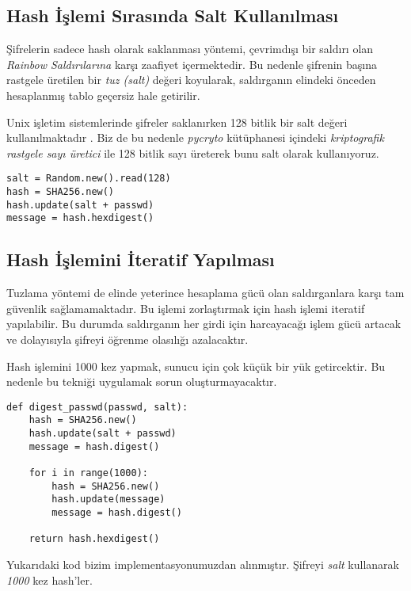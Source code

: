 \documentclass[11pt,a4paper]{report}
\begin{document}
\subsection{Hash İşlemi Sırasında Salt Kullanılması}

Şifrelerin sadece hash olarak saklanması yöntemi, çevrimdışı bir saldırı olan \emph{Rainbow Saldırılarına} karşı zaafiyet içermektedir. Bu nedenle şifrenin başına rastgele üretilen bir \emph{tuz (salt)} değeri koyularak, saldırganın elindeki önceden hesaplanmış tablo geçersiz hale getirilir.

Unix işletim sistemlerinde şifreler saklanırken 128 bitlik bir salt değeri kullanılmaktadır \cite{unixsalt}. Biz de bu nedenle \emph{pycryto} kütüphanesi içindeki \emph{kriptografik rastgele sayı üretici} ile 128 bitlik sayı üreterek bunu salt olarak kullanıyoruz.

\begin{lstlisting}[caption=Python salt ile SHA256 Kullanımı]
salt = Random.new().read(128)
hash = SHA256.new()
hash.update(salt + passwd)
message = hash.hexdigest()
\end{lstlisting}


\subsection{Hash İşlemini İteratif Yapılması}

Tuzlama yöntemi de elinde yeterince hesaplama gücü olan saldırganlara karşı tam güvenlik sağlamamaktadır. Bu işlemi zorlaştırmak için hash işlemi iteratif yapılabilir. Bu durumda saldırganın her girdi için harcayacağı işlem gücü artacak ve dolayısıyla şifreyi öğrenme olasılığı azalacaktır.

Hash işlemini 1000 kez yapmak, sunucu için çok küçük bir yük getircektir. Bu nedenle bu tekniği uygulamak sorun oluşturmayacaktır.

\begin{lstlisting}[caption=Python iteratif SHA256 Kullanımı]
def digest_passwd(passwd, salt):
    hash = SHA256.new()
    hash.update(salt + passwd)
    message = hash.digest()

    for i in range(1000):
        hash = SHA256.new()
        hash.update(message)
        message = hash.digest()

    return hash.hexdigest()
\end{lstlisting}

Yukarıdaki kod bizim implementasyonumuzdan alınmıştır. Şifreyi \emph{salt} kullanarak \emph{1000} kez hash'ler.
\end{document}
